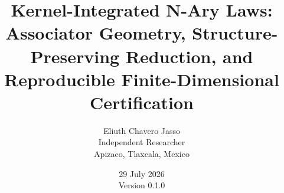 \title{Kernel-Integrated N-Ary Laws:\\ Associator Geometry, Structure-Preserving Reduction, and Reproducible Finite-Dimensional Certification}
\author{Eliuth Chavero Jasso\\Independent Researcher\\Apizaco, Tlaxcala, Mexico}
\date{29 July 2026\\\small Version 0.1.0}
